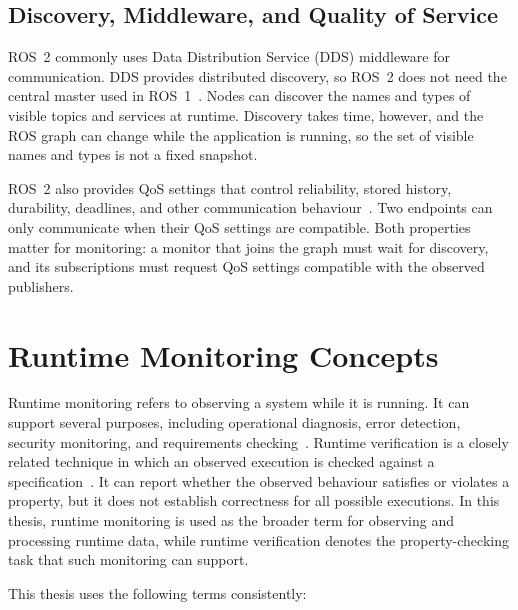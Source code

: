 \subsection{Discovery, Middleware, and Quality of Service}
\label{sec:discovery-qos}

ROS~2 commonly uses Data Distribution Service (DDS) middleware for
communication. DDS provides distributed discovery, so ROS~2 does not need the
central master used in ROS~1~\cite{macenski2022ros2}. Nodes can discover the
names and types of visible topics and services at runtime. Discovery takes
time, however, and the ROS graph can change while the application is running,
so the set of visible names and types is not a fixed snapshot.

ROS~2 also provides QoS settings that control reliability, stored history,
durability, deadlines, and other communication behaviour~\cite{ros2qos}. Two
endpoints can only communicate when their QoS settings are compatible. Both
properties matter for monitoring: a monitor that joins the graph must wait for
discovery, and its subscriptions must request QoS settings compatible with the
observed publishers.

\section{Runtime Monitoring Concepts}\label{sec:runtime-monitoring}

Runtime monitoring refers to observing a system while it is running. It can
support several purposes, including operational diagnosis, error detection,
security monitoring, and requirements checking~\cite{rabiser2019domain}.
Runtime verification is a closely related technique in which an observed
execution is checked against a specification~\cite{leucker2009brief}. It can
report whether the observed behaviour satisfies or violates a property, but it
does not establish correctness for all possible executions. In this thesis,
runtime monitoring is used as the broader term for observing and processing
runtime data, while runtime verification denotes the property-checking task
that such monitoring can support.

This thesis uses the following terms consistently:

